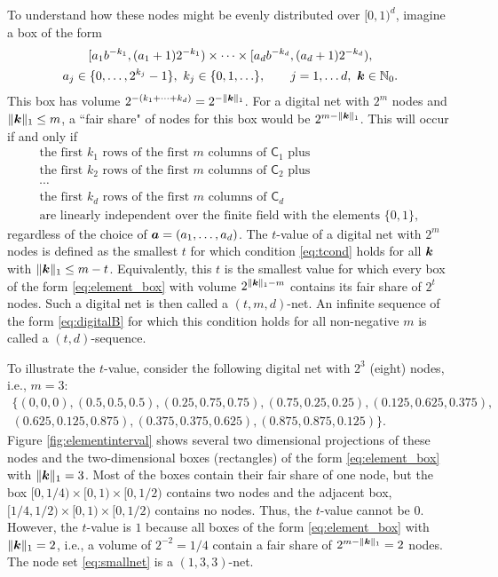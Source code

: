 \documentclass{svproc}
\begin{document}
To understand how these nodes might be evenly distributed over $[0,1)^d$, imagine a box of the form
\begin{multline} \label{eq:element_box}
	[a_1 b^{-k_1}, (a_1 + 1) 2^{-k_1}) \times \cdots \times [a_d b^{-k_d}, (a_d + 1) 2^{-k_d}), \\
	a_j \in \{0, \ldots, 2^{k_j} - 1\}, \ k_j \in \{0,1, \ldots \}, \qquad j =1, \ldots d, \ {\boldsymbol{k}} \in {\mathbb{N}}_0.
\end{multline}
This box has volume $2^{-(k_1 + \cdots +k_d)} = 2^{-\lVert{\boldsymbol{k}}\rVert_1}$.  For a digital net with $2^m$ nodes and $\lVert {\boldsymbol{k}} \rVert_1 \le m$, a ``fair share" of nodes for this box would be $2^{m- \lVert {\boldsymbol{k}} \rVert_1}$.  This will occur if and only if
\begin{multline} \label{eq:tcond}
	\text{the first $k_1$ rows of the first $m$ columns of $\mathsf{C}_1$ plus} \\
	\text{the first $k_2$ rows of the first $m$ columns of $\mathsf{C}_2$ plus} \\
	 \cdots \\
	\text{the first $k_d$ rows of the first $m$ columns of $\mathsf{C}_d$} \\
	\text{are linearly independent over the finite field with the elements $\{0,1\}$, }
\end{multline}
regardless of the choice of ${\boldsymbol{a}} = (a_1, \ldots, a_d)$.  The $t$-value of a digital net with $2^m$ nodes is defined as the smallest $t$ for which condition \eqref{eq:tcond} holds for all ${\boldsymbol{k}}$ with $\lVert {\boldsymbol{k}} \rVert_1 \le m-t$.  Equivalently, this $t$ is the smallest value for which every box of the form \eqref{eq:element_box} with volume $2^{\lVert {\boldsymbol{k}} \rVert_1 - m}$ contains its fair share of $2^t$ nodes.  Such a digital net is then called a $(t,m,d)$-net.  An infinite sequence of the form \eqref{eq:digitalB} for which this condition holds for all non-negative $m$ is called a  $(t,d)$-sequence.

To illustrate the $t$-value, consider the following digital net with $2^3$ (eight) nodes, i.e., $m = 3$:
\begin{multline} \label{eq:smallnet}
	\{(0, 0,   0),
	(0.5,   0.5,   0.5  ),
	(0.25,  0.75,  0.75 ),
	(0.75,  0.25,  0.25 ),
	(0.125, 0.625, 0.375),\\
	(0.625, 0.125, 0.875),
	(0.375, 0.375, 0.625),
	(0.875, 0.875, 0.125)\}.
\end{multline}
Figure \ref{fig:elementinterval} shows several two dimensional projections of these nodes and the two-dimensional boxes (rectangles) of the form \eqref{eq:element_box} with $\lVert{\boldsymbol{k}}\rVert_1 = 3$.  Most of the boxes contain their fair share of one node, but the box $[0,1/4) \times [0,1) \times [0,1/2)$ contains two nodes and the adjacent box, $[1/4,1/2) \times [0,1) \times [0,1/2)$ contains no nodes.  Thus, the $t$-value cannot be $0$.  However, the $t$-value is $1$ because all boxes of the form  \eqref{eq:element_box} with $\lVert{\boldsymbol{k}}\rVert_1 = 2$, i.e., a volume of $2^{-2} = 1/4$ contain a fair share of $2^{m- \lVert {\boldsymbol{k}} \rVert_1} = 2$ nodes.  The node set \eqref{eq:smallnet} is a $(1,3,3)$-net.
\end{document}
